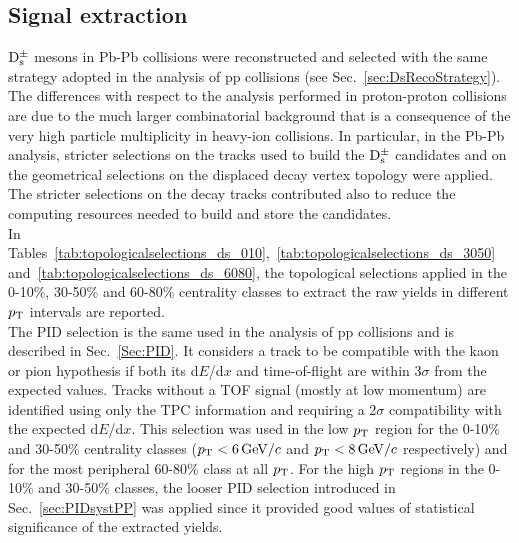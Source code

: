 \subsection{Signal extraction}
\label{sec:SelectionPbPb}
${\rm D_s^{\pm}}$ mesons in Pb-Pb collisions were reconstructed 
and selected with the same strategy adopted in the analysis of pp 
collisions (see Sec.~\ref{sec:DsRecoStrategy}). The differences with respect to
the analysis performed in proton-proton collisions are due to the much larger
combinatorial background that is a consequence of the very 
high particle multiplicity in heavy-ion collisions. In particular, 
in the Pb-Pb analysis, stricter selections on the tracks 
used to build the ${\rm D_s^{\pm}}$ candidates and on the geometrical selections
on the displaced decay vertex topology were applied. 
The stricter selections on the decay tracks contributed also to reduce the computing resources 
needed to build and store the candidates. \\



In Tables~\ref{tab:topologicalselections_ds_010},~\ref{tab:topologicalselections_ds_3050} 
and~\ref{tab:topologicalselections_ds_6080}, the topological selections applied 
in the 0-10$\%$, 30-50\% and 60-80$\%$ centrality classes
to extract the raw yields in different $p_{\rm T}$ intervals are reported.\\



The PID selection is the same used in the analysis of pp collisions and 
is described in Sec.~\ref{Sec:PID}. It considers a track to be 
compatible with the kaon or pion hypothesis 
if both its d$E$/d$x$ and time-of-flight are within 3$\sigma$ from the expected values. 
Tracks without a TOF signal (mostly at low momentum) are 
identified using only the TPC information and requiring a 2$\sigma$ 
compatibility with the expected d$E$/d$x$. This selection was used 
in the low $p_{\rm T}$ region for the 0-10\% and 30-50\% centrality classes 
($p_{\rm T} < 6 \, \mathrm{GeV}/c$ and $p_{\rm T} < 8 \, \mathrm{GeV}/c$ respectively) 
and for the most peripheral 60-80\% class at all $p_{\rm T}$. For the high $p_{\rm T}$ regions
in the 0-10\% and 30-50\% classes, the looser PID selection introduced in Sec.~\ref{sec:PIDsystPP}
was applied since it provided good values of statistical significance of the extracted yields.



